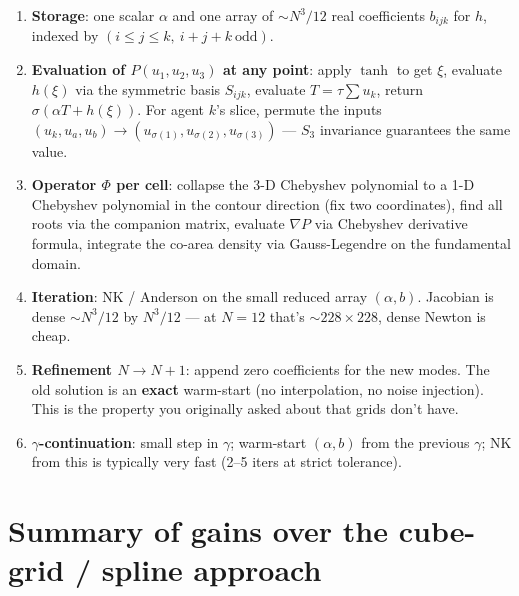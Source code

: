 \documentclass[11pt]{article}
\begin{document}
\begin{enumerate}
\item \textbf{Storage}: one scalar $\alpha$ and one array of $\sim N^3/12$
real coefficients $b_{ijk}$ for $h$, indexed by $(i \le j \le k,\ i+j+k\ \text{odd})$.

\item \textbf{Evaluation of $P(u_1, u_2, u_3)$ at any point}: apply $\tanh$
to get $\xi$, evaluate $h(\xi)$ via the symmetric basis $S_{ijk}$, evaluate
$T = \tau\sum u_k$, return $\sigma(\alpha T + h(\xi))$. For agent $k$'s
slice, permute the inputs $(u_{k}, u_a, u_b) \to (u_{\sigma(1)}, u_{\sigma(2)}, u_{\sigma(3)})$ — $S_3$ invariance guarantees the same value.

\item \textbf{Operator $\Phi$ per cell}: collapse the 3-D Chebyshev polynomial
to a 1-D Chebyshev polynomial in the contour direction (fix two
coordinates), find all roots via the companion matrix, evaluate $\nabla P$
via Chebyshev derivative formula, integrate the co-area density via
Gauss-Legendre on the fundamental domain.

\item \textbf{Iteration}: NK / Anderson on the small reduced array
$(\alpha, b)$. Jacobian is dense $\sim N^3/12$ by $N^3/12$ — at $N=12$
that's $\sim 228 \times 228$, dense Newton is cheap.

\item \textbf{Refinement $N \to N+1$}: append zero coefficients for the
new modes. The old solution is an \textbf{exact} warm-start (no interpolation,
no noise injection). This is the property you originally asked about that
grids don't have.

\item \textbf{$\gamma$-continuation}: small step in $\gamma$; warm-start
$(\alpha, b)$ from the previous $\gamma$; NK from this is typically very
fast (2–5 iters at strict tolerance).
\end{enumerate}

\section{Summary of gains over the cube-grid / spline approach}
\end{document}
